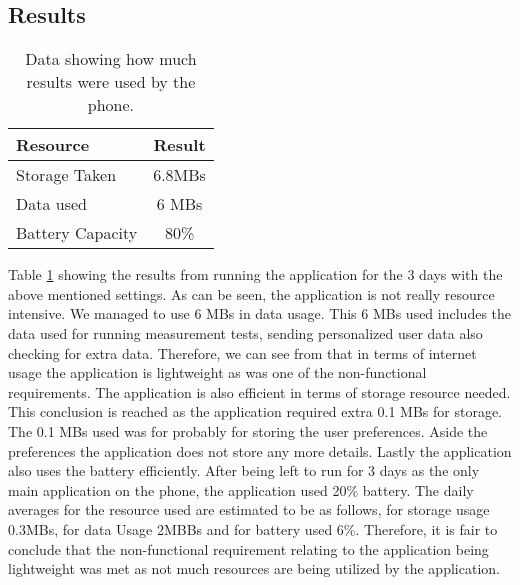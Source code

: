\subsection{Results}\label{subsec:results}
\begin{table}[h!]
    \begin{center}
        \caption{Data showing how much results were used by the phone.}
        \label{tab:results}
        \begin{tabular}{l|c} %
            \textbf{Resource} & \textbf{Result}\\
            \hline
            Storage Taken & 6.8MBs \\
            \hline
            Data used & 6 MBs \\
            \hline
            Battery Capacity & 80\% \\
            \hline
        \end{tabular}
    \end{center}
\end{table}
Table \ref{tab:results} showing the results from running the application for the 3 days with the above mentioned settings.
As can be seen, the application is not really resource intensive.
We managed to use 6 MBs in data usage.
This 6 MBs used includes the data used for running measurement tests, sending personalized user data also checking for extra data.
Therefore, we can see from that in terms of internet usage the application is lightweight as was one of the non-functional requirements.
The application is also efficient in terms of storage resource needed.
This conclusion is reached as the application required extra 0.1 MBs for storage.
The 0.1 MBs used was for probably for storing the user preferences.
Aside the preferences the application does not store any more details.
Lastly the application also uses the battery efficiently.
After being left to run for 3 days as the only main application on the phone, the application used 20\% battery.
The daily averages for the resource used are estimated to be as follows, for storage usage  0.3MBs, for data Usage 2MBBs and for battery used 6\%.
Therefore, it is fair to conclude that the non-functional requirement relating to the application being lightweight was met as not much resources are being utilized by the application.